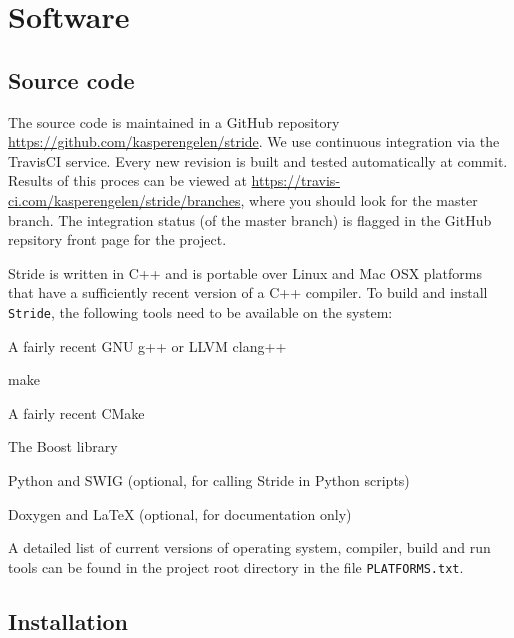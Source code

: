 \chapter{Software}
\label{chap:software}


\section{Source code}
\label{section:source}
The source code is maintained in a GitHub repository \url{https://github.com/kasperengelen/stride}. We use continuous integration via the TravisCI service. Every new revision is built and tested automatically at commit. Results of this proces can be viewed at \url{https://travis-ci.com/kasperengelen/stride/branches}, where you should look for the master branch. The integration status (of the master branch) is flagged in the GitHub repsitory front page for the project. 

Stride is written in C++ and is portable over Linux and Mac OSX platforms that have a sufficiently recent version of a C++ compiler. To build and install \texttt{Stride}, the following tools need to be available on the system:
\begin{compactitem}
    \item A fairly recent GNU g++ or LLVM clang++
    \item make
    \item A fairly recent CMake
    \item The Boost library
    \item Python and SWIG (optional, for calling Stride in Python scripts)
    \item Doxygen  and LaTeX (optional, for documentation only)
\end{compactitem}
A detailed list of current versions of operating system, compiler, build and run tools can be found in the project root directory in the file \texttt{PLATFORMS.txt}.

\section{Installation}
\label{section:Installation}

